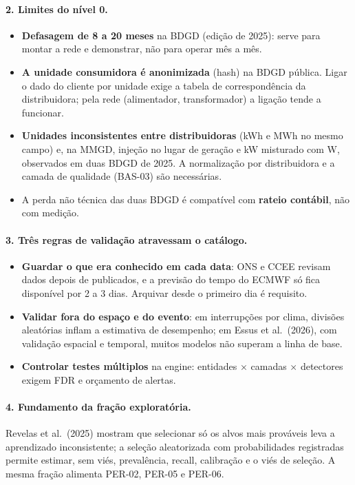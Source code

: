\paragraph{2. Limites do nível 0.}
\begin{itemize}
  \item \textbf{Defasagem de 8 a 20 meses} na BDGD (edição de 2025): serve para montar a rede e
    demonstrar, não para operar mês a mês.
  \item \textbf{A unidade consumidora é anonimizada} (hash) na BDGD pública.
    Ligar o dado do cliente por unidade exige a tabela de correspondência da
    distribuidora; pela rede (alimentador, transformador) a ligação tende a
    funcionar.
  \item \textbf{Unidades inconsistentes entre distribuidoras} (kWh e MWh no
    mesmo campo) e, na MMGD, injeção no lugar de geração e kW misturado com W,
    observados em duas BDGD de 2025. A normalização por distribuidora e a
    camada de qualidade (BAS-03) são necessárias.
  \item A perda não técnica das duas BDGD é compatível com \textbf{rateio
    contábil}, não com medição.
\end{itemize}

\paragraph{3. Três regras de validação atravessam o catálogo.}
\begin{itemize}
  \item \textbf{Guardar o que era conhecido em cada data}: ONS e CCEE revisam
    dados depois de publicados, e a previsão do tempo do ECMWF só fica
    disponível por 2 a 3 dias. Arquivar desde o primeiro dia é requisito.
  \item \textbf{Validar fora do espaço e do evento}: em interrupções por clima,
    divisões aleatórias inflam a estimativa de desempenho; em Essus et
    al.\ (2026), com validação espacial e temporal, muitos modelos não superam
    a linha de base.
  \item \textbf{Controlar testes múltiplos} na engine: entidades × camadas ×
    detectores exigem FDR e orçamento de alertas.
\end{itemize}

\paragraph{4. Fundamento da fração exploratória.} Revelas et al.\ (2025)
mostram que selecionar só os alvos mais prováveis leva a aprendizado
inconsistente; a seleção aleatorizada com probabilidades registradas permite
estimar, sem viés, prevalência, recall, calibração e o viés de seleção. A mesma fração alimenta PER-02, PER-05 e PER-06.

